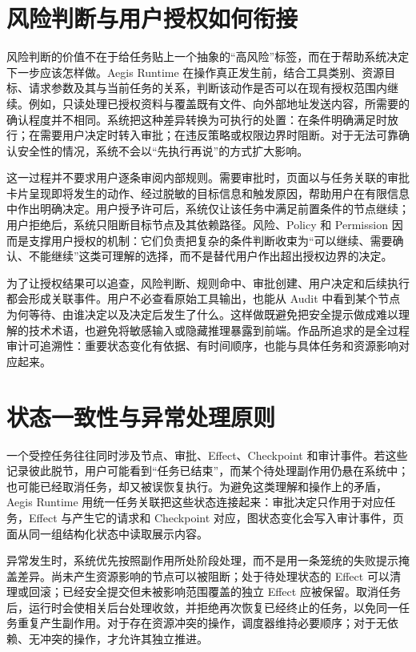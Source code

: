\section{风险判断与用户授权如何衔接}

风险判断的价值不在于给任务贴上一个抽象的“高风险”标签，而在于帮助系统决定下一步应该怎样做。Aegis Runtime 在操作真正发生前，结合工具类别、资源目标、请求参数及其与当前任务的关系，判断该动作是否可以在现有授权范围内继续。例如，只读处理已授权资料与覆盖既有文件、向外部地址发送内容，所需要的确认程度并不相同。系统把这种差异转换为可执行的处置：在条件明确满足时放行；在需要用户决定时转入审批；在违反策略或权限边界时阻断。对于无法可靠确认安全性的情况，系统不会以“先执行再说”的方式扩大影响。

这一过程并不要求用户逐条审阅内部规则。需要审批时，页面以与任务关联的审批卡片呈现即将发生的动作、经过脱敏的目标信息和触发原因，帮助用户在有限信息中作出明确决定。用户授予许可后，系统仅让该任务中满足前置条件的节点继续；用户拒绝后，系统只阻断目标节点及其依赖路径。风险、Policy 和 Permission 因而是支撑用户授权的机制：它们负责把复杂的条件判断收束为“可以继续、需要确认、不能继续”这类可理解的选择，而不是替代用户作出超出授权边界的决定。

为了让授权结果可以追查，风险判断、规则命中、审批创建、用户决定和后续执行都会形成关联事件。用户不必查看原始工具输出，也能从 Audit 中看到某个节点为何等待、由谁决定以及决定后发生了什么。这样做既避免把安全提示做成难以理解的技术术语，也避免将敏感输入或隐藏推理暴露到前端。作品所追求的是全过程审计可追溯性：重要状态变化有依据、有时间顺序，也能与具体任务和资源影响对应起来。

\section{状态一致性与异常处理原则}

一个受控任务往往同时涉及节点、审批、Effect、Checkpoint 和审计事件。若这些记录彼此脱节，用户可能看到“任务已结束”，而某个待处理副作用仍悬在系统中；也可能已经取消任务，却又被误恢复执行。为避免这类理解和操作上的矛盾，Aegis Runtime 用统一任务关联把这些状态连接起来：审批决定只作用于对应任务，Effect 与产生它的请求和 Checkpoint 对应，图状态变化会写入审计事件，页面从同一组结构化状态中读取展示内容。

异常发生时，系统优先按照副作用所处阶段处理，而不是用一条笼统的失败提示掩盖差异。尚未产生资源影响的节点可以被阻断；处于待处理状态的 Effect 可以清理或回滚；已经安全提交但未被影响范围覆盖的独立 Effect 应被保留。取消任务后，运行时会使相关后台处理收敛，并拒绝再次恢复已经终止的任务，以免同一任务重复产生副作用。对于存在资源冲突的操作，调度器维持必要顺序；对于无依赖、无冲突的操作，才允许其独立推进。

